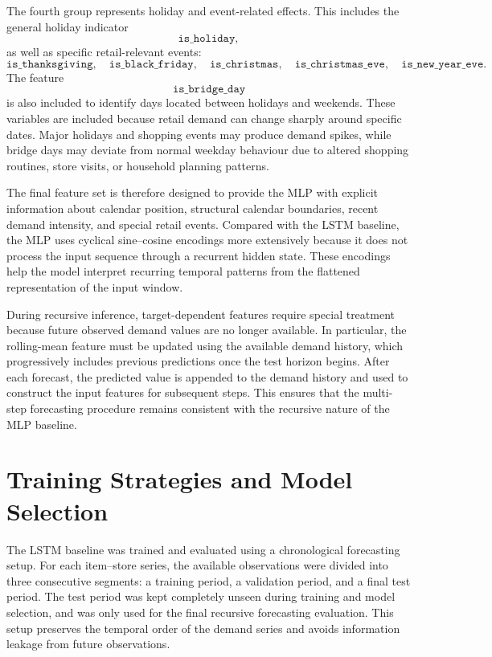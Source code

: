 The fourth group represents holiday and event-related effects. This includes the general holiday indicator
\[
\texttt{is\_holiday},
\]
as well as specific retail-relevant events:
\[
\texttt{is\_thanksgiving},\quad
\texttt{is\_black\_friday},\quad
\texttt{is\_christmas},\quad
\texttt{is\_christmas\_eve},\quad
\texttt{is\_new\_year\_eve}.
\]
The feature
\[
\texttt{is\_bridge\_day}
\]
is also included to identify days located between holidays and weekends. These variables are included because retail demand can change sharply around specific dates. Major holidays and shopping events may produce demand spikes, while bridge days may deviate from normal weekday behaviour due to altered shopping routines, store visits, or household planning patterns.

The final feature set is therefore designed to provide the MLP with explicit information about calendar position, structural calendar boundaries, recent demand intensity, and special retail events. Compared with the LSTM baseline, the MLP uses cyclical sine--cosine encodings more extensively because it does not process the input sequence through a recurrent hidden state. These encodings help the model interpret recurring temporal patterns from the flattened representation of the input window.

During recursive inference, target-dependent features require special treatment because future observed demand values are no longer available. In particular, the rolling-mean feature must be updated using the available demand history, which progressively includes previous predictions once the test horizon begins. After each forecast, the predicted value is appended to the demand history and used to construct the input features for subsequent steps. This ensures that the multi-step forecasting procedure remains consistent with the recursive nature of the MLP baseline.

\section{Training Strategies and Model Selection}
\label{subsec:lstm_training_strategies}

The LSTM baseline was trained and evaluated using a chronological forecasting setup. For each item--store series, the available observations were divided into three consecutive segments: a training period, a validation period, and a final test period. The test period was kept completely unseen during training and model selection, and was only used for the final recursive forecasting evaluation. This setup preserves the temporal order of the demand series and avoids information leakage from future observations.

